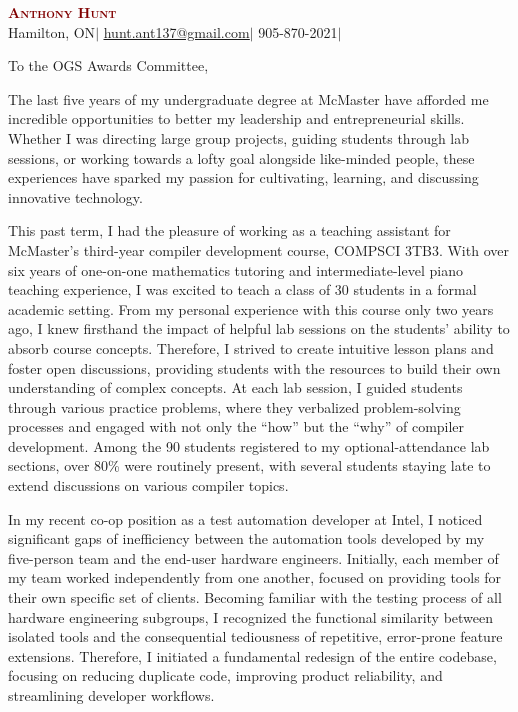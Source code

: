 \documentclass[11pt]{letter}
\makeatletter
\newcommand{\fullName}{Anthony Hunt}
\newcommand{\accentColour}{Maroon}
\newcommand{\currentCity}{Hamilton, ON}
\newcommand{\email}{\href{mailto:hunt.ant137@gmail.com}{\underline{hunt.ant137@gmail.com}}}
\newcommand{\phone}{905-870-2021}
\newcommand{\githubUrl}[1]{%
   \href{#1}{\faGithubSquare}%
  }
\newcommand{\linkedinUrl}[1]{%
   \href{#1}{\faLinkedin}%
  }
\makeatother
\begin{document}
\begin{center}
    \textcolor{\accentColour}{\textbf{\Huge \scshape \fullName}} \\ \vspace{1pt}
    \small \currentCity $|$ \email $|$ \phone $|$
    \linkedinUrl{https://linkedin.com/in/anthonyhunt137}
    \githubUrl{https://github.com/Ant13731}
\end{center}

\setlength\parindent{0pt}
To the OGS Awards Committee,
\setlength\parindent{24pt}

The last five years of my undergraduate degree at McMaster have afforded me incredible opportunities to better my leadership and entrepreneurial skills. Whether I was directing large group projects, guiding students through lab sessions, or working towards a lofty goal alongside like-minded people, these experiences have sparked my passion for cultivating, learning, and discussing innovative technology.

This past term, I had the pleasure of working as a teaching assistant for McMaster's third-year compiler development course, COMPSCI 3TB3. With over six years of one-on-one mathematics tutoring and intermediate-level piano teaching experience, I was excited to teach a class of 30 students in a formal academic setting. From my personal experience with this course only two years ago, I knew firsthand the impact of helpful lab sessions on the students' ability to absorb course concepts. Therefore, I strived to create intuitive lesson plans and foster open discussions, providing students with the resources to build their own understanding of complex concepts. At each lab session, I guided students through various practice problems, where they verbalized problem-solving processes and engaged with not only the “how” but the “why” of compiler development. Among the 90 students registered to my optional-attendance lab sections, over 80\% were routinely present, with several students staying late to extend discussions on various compiler topics.

In my recent co-op position as a test automation developer at Intel, I noticed significant gaps of inefficiency between the automation tools developed by my five-person team and the end-user hardware engineers. Initially, each member of my team worked independently from one another, focused on providing tools for their own specific set of clients. Becoming familiar with the testing process of all hardware engineering subgroups, I recognized the functional similarity between isolated tools and the consequential tediousness of repetitive, error-prone feature extensions. Therefore, I initiated a fundamental redesign of the entire codebase, focusing on reducing duplicate code, improving product reliability, and streamlining developer workflows.
\end{document}
